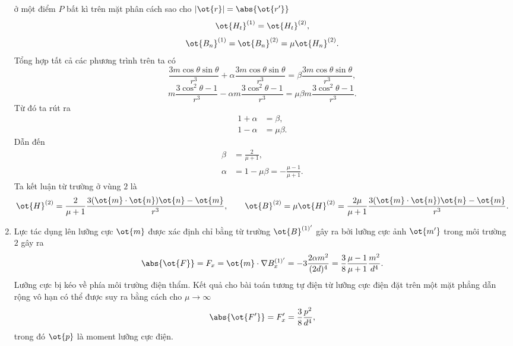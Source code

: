 \begin{loigiai}
\begin{enumerate}[1)]
ở một điểm $P$ bất kì trên mặt phân cách sao cho $ |\ot{r}| = \abs{\ot{r'}}$
    $$\ot{H_t}^{(1)} = \ot{H_t}^{(2)},$$
$$\ot{B_n}^{(1)} = \ot{B_n}^{(2)} = \mu    \ot{H_n}^{(2)}. $$
Tổng hợp tất cả các phương trình trên ta có
   $$\frac{3m\cos\theta\sin\theta}{r^3} +\alpha \frac{3m\cos\theta\sin\theta}{r^3} =\beta\frac{3m\cos\theta\sin\theta}{r^3},$$
    $$m\frac{3\cos^2 \theta -1}{r^3} - \alpha m\frac{3\cos^2 \theta -1}{r^3} = \mu\beta m \frac{3\cos^2 \theta -1}{r^3}.$$
Từ đó ta rút ra 
    \[\begin{aligned}
     1+\alpha &= \beta,\\
     1- \alpha &= \mu\beta.
    \end{aligned}\]
Dẫn đến
 \[\begin{aligned}
    \beta &= \frac{2}{\mu +1},\\
    \alpha &= 1 -\mu\beta = -\frac{\mu -1}{\mu +1}.
    \end{aligned}\]
Ta kết luận từ trường ở vùng $2$ là
    $$\ot{H}^{(2)} = \frac{2}{\mu +1} \frac{3(\ot{m}\cdot \ot{n})\ot{n} -\ot{m}}{r^3}, \quad\quad \ot{B}^{(2)} =\mu\ot{H}^{(2)} = \frac{2\mu}{\mu +1}\frac{3(\ot{m}\cdot \ot{n})\ot{n} -\ot{m}}{r^3}.$$
\item Lực tác dụng lên lưỡng cực $\ot{m}$ được xác định chỉ bằng từ trường $\ot{B}^{(1)'}$ gây ra bởi lưỡng cực ảnh $\ot{m'}$ trong môi trường $2$ gây ra 
      $$\abs{\ot{F}} = F_x=\ot{m}\cdot\nabla B_x^{(1)'} = -3\frac{2\alpha m^2}{(2d)^4} = \frac{3}{8} \frac{\mu -1}{\mu +1}\frac{m^2}{d^4}.$$
Lưỡng cực bị kéo về phía môi trường điện thẩm. Kết quả cho bài toán tương tự điện từ lưỡng cực  điện đặt trên một mặt phẳng dẫn rộng vô hạn có thể được suy ra bằng cách cho $\mu \rightarrow \infty$
    $$\abs{\ot{F'}} = F'_x = \frac{3}{8} \frac{p^2}{d^4},$$
trong đó $\ot{p}$ là moment lưỡng cực điện.
\end{enumerate}
\end{loigiai}





